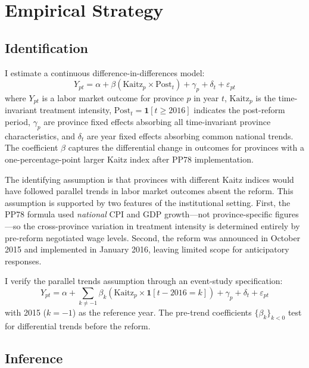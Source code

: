 \documentclass[12pt]{article}
\begin{document}
\section{Empirical Strategy}
\label{sec:strategy}

\subsection{Identification}

I estimate a continuous difference-in-differences model:
\begin{equation}
Y_{pt} = \alpha + \beta \left(\text{Kaitz}_p \times \text{Post}_t\right) + \gamma_p + \delta_t + \varepsilon_{pt}
\label{eq:did}
\end{equation}
where $Y_{pt}$ is a labor market outcome for province $p$ in year $t$, $\text{Kaitz}_p$ is the time-invariant treatment intensity, $\text{Post}_t = \mathbf{1}[t \geq 2016]$ indicates the post-reform period, $\gamma_p$ are province fixed effects absorbing all time-invariant province characteristics, and $\delta_t$ are year fixed effects absorbing common national trends. The coefficient $\beta$ captures the differential change in outcomes for provinces with a one-percentage-point larger Kaitz index after PP78 implementation.

The identifying assumption is that provinces with different Kaitz indices would have followed parallel trends in labor market outcomes absent the reform. This assumption is supported by two features of the institutional setting. First, the PP78 formula used \textit{national} CPI and GDP growth---not province-specific figures---so the cross-province variation in treatment intensity is determined entirely by pre-reform negotiated wage levels. Second, the reform was announced in October 2015 and implemented in January 2016, leaving limited scope for anticipatory responses.

I verify the parallel trends assumption through an event-study specification:
\begin{equation}
Y_{pt} = \alpha + \sum_{k \neq -1} \beta_k \left(\text{Kaitz}_p \times \mathbf{1}[t - 2016 = k]\right) + \gamma_p + \delta_t + \varepsilon_{pt}
\label{eq:eventstudy}
\end{equation}
with 2015 ($k = -1$) as the reference year. The pre-trend coefficients $\{\beta_k\}_{k < 0}$ test for differential trends before the reform.

\subsection{Inference}
\end{document}
